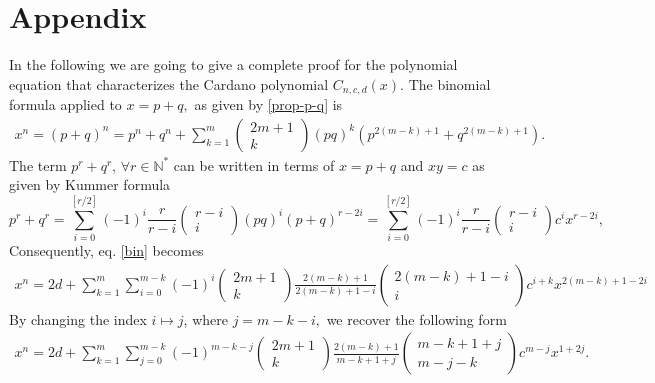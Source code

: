 \documentclass[11pt,reqno]{amsart}
\begin{document}
\section{Appendix}
\label{s:A}
In the following we are going to give a complete proof for the polynomial equation that characterizes the  Cardano polynomial $C_{n,c,d}(x)$. The binomial formula applied to $x=p+q,$ as given by \eqref{prop-p-q} is
    \begin{eqnarray}\label{bin}
    x^{n}=(p+q)^n=p^n+q^n+\sum\limits_{k=1}^{m }\begin{pmatrix}2m+1\\k\end{pmatrix}(pq)^{k}(p^{2(m-k)+1}+q^{2(m-k)+1})\label{bin-formula}.\end{eqnarray}
    The term $p^r+q^r, \, \forall r\in\mathbb{N^*}$ can be written in terms of $x=p+q$ and $xy=c $ as given by Kummer formula\cite{Ma2005}
\begin{equation}\label{Krummer}
    p^r+q^r=\sum\limits_{i=0}^{[r/2]}(-1)^i\frac{r}{r-i}\begin{pmatrix}
        r-i\\i
    \end{pmatrix}(pq)^i(p+q)^{r-2i}=\sum\limits_{i=0}^{[r/2]}(-1)^i\frac{r}{r-i}\begin{pmatrix}
        r-i\\i
    \end{pmatrix}c^ix^{r-2i},
\end{equation}
Consequently, eq. \eqref{bin} becomes
\begin{eqnarray}
x^n=2d+\sum\limits_{k=1}^{m}\sum\limits_{i=0}^{m-k} (-1)^i\begin{pmatrix}2m+1\\k\end{pmatrix}\frac{2(m-k)+1}{2(m-k)+1-i}\begin{pmatrix}
        2(m-k)+1-i\\i
    \end{pmatrix}c^{i+k}x^{2(m-k)+1 -2i}
    \label{gen-eq1}
\end{eqnarray}
By changing the index $i\mapsto j$, where $j=m-k-i,$ we recover  the following form
\begin{eqnarray}
x^n=2d+\sum\limits_{k=1}^{m}\sum\limits_{j=0}^{m-k} (-1)^{m-k-j}\begin{pmatrix}2m+1\\k\end{pmatrix}\frac{2(m-k)+1}{m-k+1+j}\begin{pmatrix}
        m-k+1+j\\m-j-k
    \end{pmatrix}c^{m-j}x^{1+2j}
    \label{gen-eq11}.
\end{eqnarray}
\end{document}

